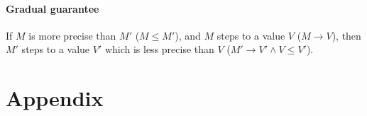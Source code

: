 \documentclass[\ClassReview acmsmall,screen,prologue,dvipsnames,style=authoryear,anonymous]{acmart}
\begin{document}
\paragraph{Gradual guarantee} If $M$ is more precise than $M'$ ($M \le M'$),
and $M$ steps to a value $V$ ($M \to V$), then $M'$ steps to a value $V'$ which
is less precise than $V$ ($M' \to V' \wedge V \le V'$).









\appendix
\section{Appendix}
\label{sec:appendix}




\end{document}
